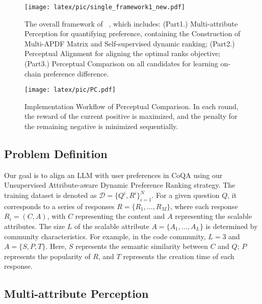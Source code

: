 \begin{figure*}[t]
    \centering
    \texttt{[image: latex/pic/single\_framework1\_new.pdf]}
    \caption{The overall framework of \shortname \
    , which includes: (Part1.) Multi-attribute Perception for quantifying preference, containing the Construction of Multi-APDF Matrix and Self-supervised dynamic ranking; (Part2.) Perceptual Alignment for aligning the optimal ranks objective; (Part3.) Perceptual Comparison on all candidates for learning on-chain preference difference.}
    \label{overall}
    \vspace{-0.5cm}
\end{figure*}
\begin{figure}[ht]
    \centering
    \texttt{[image: latex/pic/PC.pdf]}
    \caption{Implementation Workflow of Perceptual Comparison. In each round, the reward of the current positive is maximized, and the penalty for the remaining negative is minimized sequentially.}
    \vspace{-0.2cm}
\end{figure}
\subsection{Problem Definition}
Our goal is to align an LLM with user preferences in CoQA using our Unsupervised Attribute-aware Dynamic Preference Ranking strategy.
The training dataset is denoted as \(\mathcal{D} = \{Q^{i}, R^{i}\}_{i=1}^{N}\). For a given question \(Q\), it corresponds to a series of responses \(R = \{R_1, \ldots, R_M\}\), where each response \(R_i = (C, A)\), with \(C\) representing the content and \(A\) representing the scalable attributes. The size \(L\) of the scalable attribute \(A = \{A_1, \ldots, A_L\}\) is determined by community characteristics. For example, in the code community, \(L=3\) and \(A = \{S, P, T\}\).
Here, \(S\) represents the semantic similarity between \(C\) and \(Q\); \(P\) represents the popularity of \(R\), and \(T\) represents the creation time of each response.
\subsection{Multi-attribute Perception}

